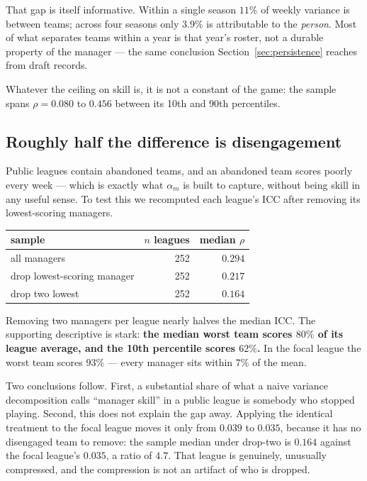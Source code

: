 \documentclass[11pt]{article}
\begin{document}
That gap is itself informative. Within a single season $11\%$ of weekly variance
is between teams; across four seasons only $3.9\%$ is attributable to the
\emph{person}. Most of what separates teams within a year is that year's roster,
not a durable property of the manager --- the same conclusion
Section~\ref{sec:persistence} reaches from draft records.

Whatever the ceiling on skill is, it is not a constant of the game: the sample
spans $\rho = 0.080$ to $0.456$ between its 10th and 90th percentiles.

\subsection{Roughly half the difference is disengagement}\label{sec:dead}

Public leagues contain abandoned teams, and an abandoned team scores poorly every
week --- which is exactly what $\alpha_m$ is built to capture, without being
skill in any useful sense. To test this we recomputed each league's ICC after
removing its lowest-scoring managers.

\begin{center}\small
\begin{tabular}{lrr}
\toprule
sample & $n$ leagues & median $\rho$ \\
\midrule
all managers                & 252 & $0.294$ \\
drop lowest-scoring manager & 252 & $0.217$ \\
drop two lowest             & 252 & $0.164$ \\
\bottomrule
\end{tabular}
\end{center}

Removing two managers per league nearly halves the median ICC. The supporting
descriptive is stark: \textbf{the median worst team scores $80\%$ of its league
average, and the 10th percentile scores $62\%$.} In the focal league the worst
team scores $93\%$ --- every manager sits within $7\%$ of the mean.

Two conclusions follow. First, a substantial share of what a naive variance
decomposition calls ``manager skill'' in a public league is somebody who stopped
playing. Second, this does not explain the gap away. Applying the identical treatment to the
focal league moves it only from $0.039$ to $0.035$, because it has no disengaged
team to remove: the sample median under drop-two is $0.164$ against the focal
league's $0.035$, a ratio of $4.7$. That league is genuinely, unusually compressed, and
the compression is not an artifact of who is dropped.
\end{document}
